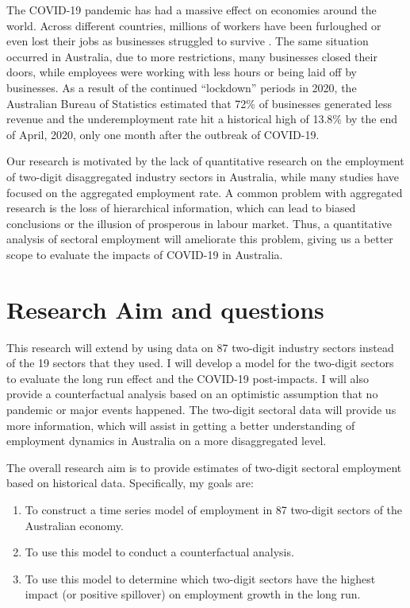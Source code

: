 \documentclass{monashthesis}
\begin{document}
The COVID-19 pandemic has had a massive effect on economies around the world. Across different countries, millions of workers have been furloughed or even lost their jobs as businesses struggled to survive \autocite{ny2020}. The same situation occurred in Australia, due to more restrictions, many businesses closed their doors, while employees were working with less hours or being laid off by businesses. As a result of the continued ``lockdown'' periods in 2020, the Australian Bureau of Statistics \autocite{ABS2021} estimated that 72\% of businesses generated less revenue and the underemployment rate hit a historical high of 13.8\% by the end of April, 2020, only one month after the outbreak of COVID-19.

Our research is motivated by the lack of quantitative research on the employment of two-digit disaggregated industry sectors in Australia, while many studies have focused on the aggregated employment rate. A common problem with aggregated research is the loss of hierarchical information, which can lead to biased conclusions or the illusion of prosperous in labour market. Thus, a quantitative analysis of sectoral employment will ameliorate this problem, giving us a better scope to evaluate the impacts of COVID-19 in Australia.

\hypertarget{research-aim-and-questions}{%
\section{Research Aim and questions}\label{research-aim-and-questions}}

This research will extend \textcite{anderson2020} by using data on 87 two-digit industry sectors instead of the 19 sectors that they used. I will develop a model for the two-digit sectors to evaluate the long run effect and the COVID-19 post-impacts. I will also provide a counterfactual analysis based on an optimistic assumption that no pandemic or major events happened. The two-digit sectoral data will provide us more information, which will assist in getting a better understanding of employment dynamics in Australia on a more disaggregated level.

The overall research aim is to provide estimates of two-digit sectoral employment based on historical data. Specifically, my goals are:

\begin{enumerate}
\def\labelenumi{\arabic{enumi}.}
\item
  To construct a time series model of employment in 87 two-digit sectors of the Australian economy.
\item
  To use this model to conduct a counterfactual analysis.
\item
  To use this model to determine which two-digit sectors have the highest impact (or positive spillover) on employment growth in the long run.
\end{enumerate}
\end{document}
